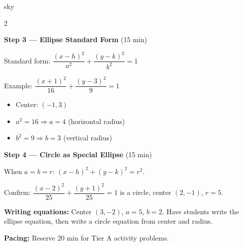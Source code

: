 \documentclass[10pt]{article}
\begin{document}
\begin{skillbox}{sky}
\begin{multicols}{2}

\textbf{Step 3 --- Ellipse Standard Form} (15 min)

Standard form: $\dfrac{(x-h)^2}{a^2} + \dfrac{(y-k)^2}{b^2} = 1$

Example: $\dfrac{(x+1)^2}{16} + \dfrac{(y-3)^2}{9} = 1$
\begin{itemize}[leftmargin=1.2em, itemsep=2pt]
  \item Center: $(-1, 3)$
  \item $a^2 = 16 \Rightarrow a = 4$ (horizontal radius)
  \item $b^2 = 9 \Rightarrow b = 3$ (vertical radius)
\end{itemize}

\columnbreak

\textbf{Step 4 --- Circle as Special Ellipse} (15 min)

When $a = b = r$: $(x-h)^2 + (y-k)^2 = r^2$.

Confirm: $\dfrac{(x-2)^2}{25} + \dfrac{(y+1)^2}{25} = 1$ is a circle,
center $(2,-1)$, $r = 5$.

\textbf{Writing equations:} Center $(3,-2)$, $a = 5$, $b = 2$.
Have students write the ellipse equation, then write a circle equation from
center and radius.

\end{multicols}

\smallskip
\textbf{Pacing:} Reserve 20 min for Tier A activity problems.
\end{skillbox}

\vspace{0.08in}
\end{document}
